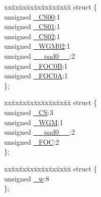 \begin{DoxyCompactItemize}
\item 
\begin{tabbing}
xx\=xx\=xx\=xx\=xx\=xx\=xx\=xx\=xx\=\kill
struct \{\\
\>unsigned \hyperlink{union_____t_c_c_r0_bbits__t_a8d43b2f332244505a61be10fd377fb89}{\_CS00}:1\\
\>unsigned \hyperlink{union_____t_c_c_r0_bbits__t_aa0e694c24a25f7ea20a7da739db12e1c}{\_CS01}:1\\
\>unsigned \hyperlink{union_____t_c_c_r0_bbits__t_a9f69a44610a069486fcef8ae3e25079d}{\_CS02}:1\\
\>unsigned \hyperlink{union_____t_c_c_r0_bbits__t_a7c0d95d175ca1cbee86c654da6447188}{\_WGM02}:1\\
\>unsigned \hyperlink{union_____t_c_c_r0_bbits__t_a85156b27745ee0984dbbcbdcc15e78cf}{\_\_pad0\_\_}:2\\
\>unsigned \hyperlink{union_____t_c_c_r0_bbits__t_aa0c4ada08d75e0374ca54e10b5bd99c3}{\_FOC0B}:1\\
\>unsigned \hyperlink{union_____t_c_c_r0_bbits__t_a679f80d4e26d625bcd03c6a71ee08706}{\_FOC0A}:1\\
\}; \\

\end{tabbing}\item 
\begin{tabbing}
xx\=xx\=xx\=xx\=xx\=xx\=xx\=xx\=xx\=\kill
struct \{\\
\>unsigned \hyperlink{union_____t_c_c_r0_bbits__t_ab21c04125966534d7939628a9077208d}{\_CS}:3\\
\>unsigned \hyperlink{union_____t_c_c_r0_bbits__t_ab6d80be66c8a595dc05635ede3f6b277}{\_WGM}:1\\
\>unsigned \hyperlink{union_____t_c_c_r0_bbits__t_a85156b27745ee0984dbbcbdcc15e78cf}{\_\_pad0\_\_}:2\\
\>unsigned \hyperlink{union_____t_c_c_r0_bbits__t_ac764c3a1780c7eaa7010ac6133d0c1c7}{\_FOC}:2\\
\}; \\

\end{tabbing}\item 
\begin{tabbing}
xx\=xx\=xx\=xx\=xx\=xx\=xx\=xx\=xx\=\kill
struct \{\\
\>unsigned \hyperlink{union_____t_c_c_r0_bbits__t_a48fc3459d791c25faf5a2e853ae01459}{\_w}:8\\
\}; \\

\end{tabbing}\end{DoxyCompactItemize}


